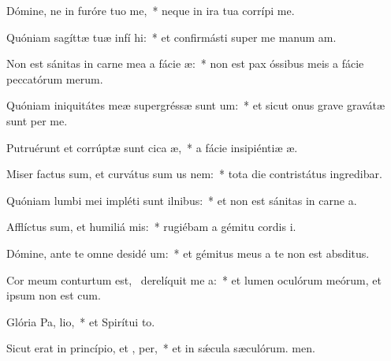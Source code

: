 \item Dómine, ne in furóre tuo  me,~* neque in ira tua corrípi me.
\item Quóniam sagíttæ tuæ infí  hi:~* et confirmásti super me manum am.
\item Non est sánitas in carne mea a fácie  æ:~* non est pax óssibus meis a fácie peccatórum merum.
\item Quóniam iniquitátes meæ supergréssæ sunt  um:~* et sicut onus grave gravátæ sunt per me.
\item Putruérunt et corrúptæ sunt cica æ,~* a fácie insipiéntiæ æ.
\item Miser factus sum, et curvátus sum us  nem:~* tota die contristátus ingredibar.
\item Quóniam lumbi mei impléti sunt ilnibus:~* et non est sánitas in carne a.
\item Afflíctus sum, et humiliá  mis:~* rugiébam a gémitu cordis i.
\item Dómine, ante te omne desidé um:~* et gémitus meus a te non est absditus.
\item Cor meum conturtum est,~\pscross{} derelíquit me  a:~* et lumen oculórum meórum, et ipsum non est cum.
\item Glória Pa,  lio,~* et Spirítui to.
\item Sicut erat in princípio, et ,  per,~* et in sǽcula sæculórum. men.
